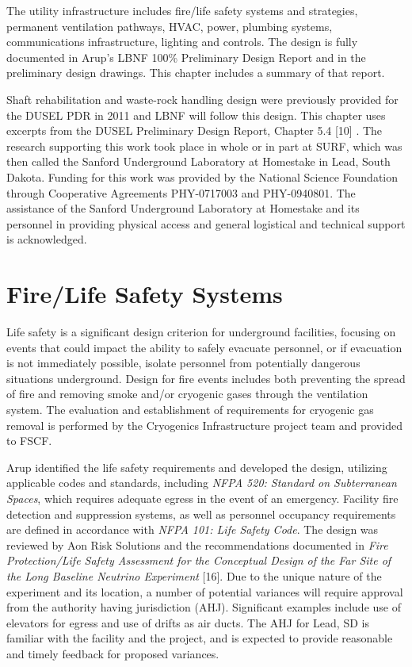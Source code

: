 The utility infrastructure includes fire/life safety systems and strategies, permanent ventilation pathways, %
HVAC, power, plumbing systems, communications infrastructure, lighting and controls. The design is fully documented in Arup's LBNF 100\% Preliminary Design Report\cite{arup:fscf100pdr} and in the preliminary design drawings. This chapter includes a summary of %
that report.

Shaft rehabilitation and waste-rock handling design were previously provided for the DUSEL PDR in 2011 and LBNF will follow this design. This chapter uses excerpts from the DUSEL Preliminary Design Report, Chapter 5.4 [10] . The research supporting this work took place in whole or in part at SURF, which was then called the Sanford Underground Laboratory at Homestake in Lead, South Dakota. Funding for this work was provided by the National Science Foundation through Cooperative Agreements PHY-0717003 and PHY-0940801. The assistance of the Sanford Underground Laboratory at Homestake and its personnel in providing physical access and general logistical and technical support is acknowledged.

\section{Fire/Life Safety Systems}
\label{sec:fscf-und-fire}

Life safety is a significant design criterion for underground facilities, focusing on events that could impact the ability to safely %
evacuate personnel, or if evacuation is not immediately possible, isolate personnel from potentially dangerous situations %
underground. Design for fire events includes both preventing the spread of fire and removing smoke and/or cryogenic gases through the ventilation system. The evaluation and establishment of requirements for cryogenic gas removal is performed by the Cryogenics Infrastructure project team and provided to FSCF.

Arup identified the life safety requirements and developed the design, utilizing applicable codes and standards, including \textit{NFPA 520: Standard on Subterranean Spaces}, which requires adequate egress in the event of an emergency. Facility fire detection and suppression systems, as well as personnel occupancy requirements are defined in accordance with \textit{NFPA 101: Life Safety Code}. The design was reviewed by Aon Risk Solutions and the recommendations documented in \textit{Fire Protection/Life Safety Assessment for the Conceptual Design of the Far Site of the Long Baseline Neutrino Experiment}  [16]. Due to the unique nature of the experiment and its location, a number of potential variances will require approval from the authority having jurisdiction (AHJ). Significant examples include use of elevators for egress and use of drifts as air ducts. The AHJ for Lead, SD is familiar with the facility and the project, and is expected to provide reasonable and timely feedback for proposed variances.  


